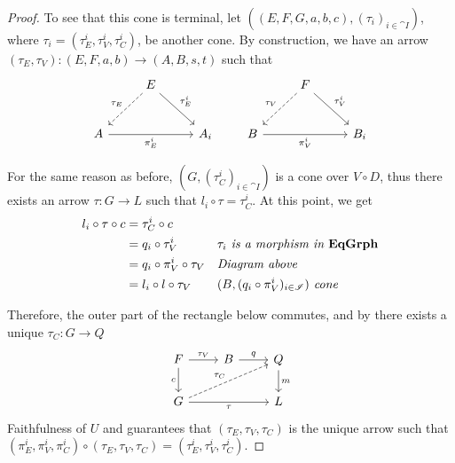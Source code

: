 \begin{proof}
	To see that this cone is terminal, let $((E, F, G, a, b, c), (\tau_i)_{i \in \cat I})$, where $\tau_i = (\tau_E^i, \tau_V^i, \tau_C^i)$, be another cone. By construction, we have an arrow $(\tau_E, \tau_V):(E, F, a, b) \to (A, B, s, t)$ such that
    \[
        \begin{tikzcd}[row sep = 26, column sep = 26]
            & E \arrow[dl, dashed, "{\tau_E}" swap] \arrow[dr, "{\tau_E^i}"] & \\
            A \arrow[rr, "{\pi_E^i}" swap] & & A_i 
        \end{tikzcd}
        \qquad
        \begin{tikzcd}[row sep = 26, column sep = 26]
            & F \arrow[dl, dashed, "{\tau_V}" swap] \arrow[dr, "{\tau_V^i}"] & \\
            B \arrow[rr, "{\pi_V^i}" swap] & & B_i 
        \end{tikzcd}
    \]

    For the same reason as before, $(G, (\tau_C^i)_{i\in \cat I})$ is a cone over $V \circ D$, thus there exists an arrow $\tau : G \to L$ such that $l_i \circ \tau = \tau_C^i$. At this point, we get
    \begin{align*}
        l_i\circ \tau \circ c 
                        &= \tau_C^i\circ c              && \\
                        &=q_i\circ \tau_V^i             && \textit{$\tau_i$ is a morphism in $\mathbf{EqGrph}$}\\
                        &=q_i\circ \pi_V^i\circ \tau_V  && \textit{Diagram above} \\
                        &=l_i\circ l\circ \tau_V        && \textit{$(B, (q_i\circ \pi_V^i)_{i \in \mathscr{I}})$ cone} 
    \end{align*} 

	Therefore, the outer part of the rectangle below commutes, and by  there exists a unique $\tau_C: G \to Q$
    \[
        \begin{tikzcd}
            F \arrow[r, "{\tau_V}"] \arrow[d, "c"swap] & B \arrow[r, "q"] & Q \arrow[d, "m"] \\
            G \arrow[urr, dashed, "{\tau_C}"] \arrow[rr, "{\tau}"swap] & & L
        \end{tikzcd}
    \]
     Faithfulness of $U$ and  guarantees that $(\tau_E, \tau_V, \tau_C)$ is the unique arrow such that $(\pi_E^i, \pi_V^i, \pi_C^i) \circ (\tau_E, \tau_V, \tau_C) = (\tau_E^i, \tau_V^i, \tau_C^i)$.


\end{proof}
